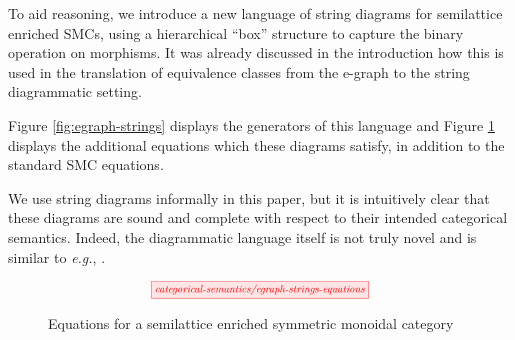 To aid reasoning, we introduce a new language of string diagrams for semilattice enriched SMCs, using a hierarchical ``box'' structure to capture the binary operation on morphisms.  It was already discussed in the introduction how this is  used in the translation of equivalence classes from the e-graph to the string diagrammatic setting. 

Figure \ref{fig:egraph-strings} displays the generators of this language and Figure \ref{fig:string-equations} displays the additional equations which these diagrams satisfy, in addition to the standard SMC equations. 

We use string diagrams informally in this paper, but it is intuitively clear that these diagrams are sound and complete with respect to their intended categorical semantics. Indeed, the diagrammatic language itself is not truly novel and is similar to \textit{e.g.}, \cite{duncan_generalised_2009}. 

\begin{figure}
\[  
    \scalebox{0.75}{
	\tikzfig{categorical-semantics/egraph-strings-equations}
    }
\]
\caption{Equations for a  semilattice enriched symmetric monoidal category}
\label{fig:string-equations}
\end{figure}
